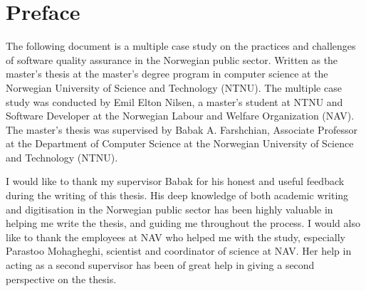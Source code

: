 \chapter*{Preface}
The following document is a multiple case study on the practices and challenges of software quality assurance in the Norwegian public sector. Written as the master's thesis at the master's degree program in computer science at the Norwegian University of Science and Technology (NTNU). The multiple case study was conducted by Emil Elton Nilsen, a master's student at NTNU and Software Developer at the Norwegian Labour and Welfare Organization (NAV). The master's thesis was supervised by Babak A. Farshchian, Associate Professor at the Department of Computer Science at the Norwegian University of Science and Technology (NTNU).

I would like to thank my supervisor Babak for his honest and useful feedback during the writing of this thesis. His deep knowledge of both academic writing and digitisation in the Norwegian public sector has been highly valuable in helping me write the thesis, and guiding me throughout the process. I would also like to thank the employees at NAV who helped me with the study, especially Parastoo Mohagheghi, scientist and coordinator of science at NAV. Her help in acting as a second supervisor has been of great help in giving a second perspective on the thesis.